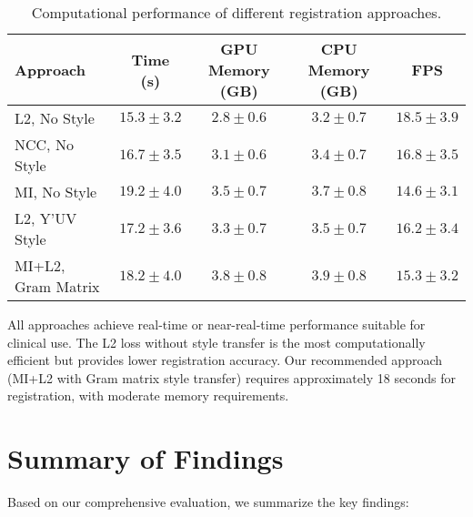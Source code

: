 \begin{table}[htpb]
  \caption[Computational performance of different registration approaches]{Computational performance of different registration approaches.}\label{tab:computational}
  \centering
  \begin{tabular}{l c c c c}
    \toprule
      Approach & Time (s) & GPU Memory (GB) & CPU Memory (GB) & FPS \\
    \midrule
      L2, No Style & $15.3 \pm 3.2$ & $2.8 \pm 0.6$ & $3.2 \pm 0.7$ & $18.5 \pm 3.9$ \\
      NCC, No Style & $16.7 \pm 3.5$ & $3.1 \pm 0.6$ & $3.4 \pm 0.7$ & $16.8 \pm 3.5$ \\
      MI, No Style & $19.2 \pm 4.0$ & $3.5 \pm 0.7$ & $3.7 \pm 0.8$ & $14.6 \pm 3.1$ \\
      L2, Y'UV Style & $17.2 \pm 3.6$ & $3.3 \pm 0.7$ & $3.5 \pm 0.7$ & $16.2 \pm 3.4$ \\
      MI+L2, Gram Matrix & $18.2 \pm 4.0$ & $3.8 \pm 0.8$ & $3.9 \pm 0.8$ & $15.3 \pm 3.2$ \\
    \bottomrule
  \end{tabular}
\end{table}

All approaches achieve real-time or near-real-time performance suitable for clinical use. The L2 loss without style transfer is the most computationally efficient but provides lower registration accuracy. Our recommended approach (MI+L2 with Gram matrix style transfer) requires approximately 18 seconds for registration, with moderate memory requirements.

\section{Summary of Findings}

Based on our comprehensive evaluation, we summarize the key findings:

